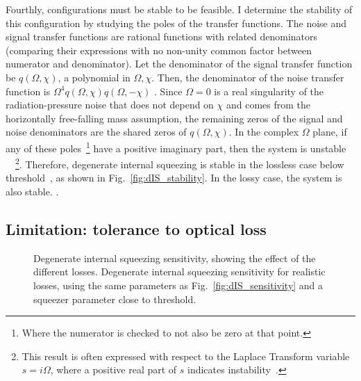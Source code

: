 Fourthly, configurations must be stable to be feasible. I determine the stability of this configuration by studying the poles of the transfer functions. 
The noise and signal transfer functions are rational functions with related denominators (comparing their expressions with no non-unity common factor between numerator and denominator). Let the denominator of the signal transfer function be $q(\Omega,\chi)$, a polynomial in $\Omega,\chi$. Then, the denominator of the noise transfer function is $\Omega^4 q(\Omega,\chi) q(\Omega,-\chi)$ . Since $\Omega=0$ is a real singularity of the radiation-pressure noise that does not depend on $\chi$ and comes from the horizontally free-falling mass assumption, the remaining zeros of the signal and noise denominators are the shared zeros of $q(\Omega,\chi)$. In the complex $\Omega$ plane, if any of these poles~\footnote{Where the numerator is checked to not also be zero at that point.} have a positive imaginary part, then the system is unstable ~\cite{}~\footnote{This result is often expressed with respect to the Laplace Transform variable $s=i\Omega$, where a positive real part of $s$ indicates instability~\cite{}.}. %
Therefore, degenerate internal squeezing is stable in the lossless case below threshold~\cite{}, as shown in Fig.~\ref{fig:dIS_stability}. In the lossy case, the system is also stable. .


\subsection{Limitation: tolerance to optical loss}
\label{sec:dIS_optical_loss}

\begin{figure}
	\centering
	\caption{ Degenerate internal squeezing sensitivity, showing the effect of the different losses.  Degenerate internal squeezing sensitivity for realistic losses, using the same parameters as Fig.~\ref{fig:dIS_sensitivity} and a squeezer parameter close to threshold. }
	\label{fig:dIS_loss_tolerance}
\end{figure}

